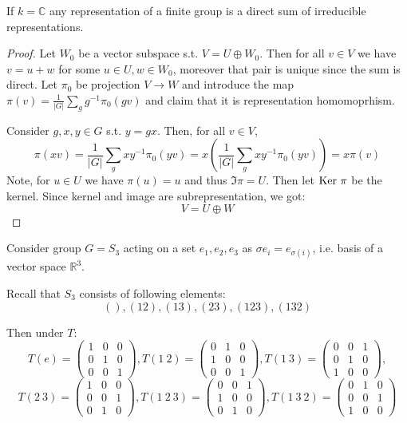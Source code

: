 \documentclass{amsart}
\def\ker{\rm Ker\ }
\begin{document}
\begin{lemma}
    If $k = \mathbb{C}$ any representation of a finite group is a direct sum of irreducible representations.
\end{lemma}
\begin{proof}
    Let $W_0$ be a vector subspace s.t. $V = U \oplus W_0$. Then for all $v \in V$ we have $v=u+w$ for some $u \in U, w \in W_0$, moreover that pair is unique since the sum is direct. Let $\pi_0$ be projection $V \to W$ and introduce the map
    $\pi(v) = \frac 1 {|G|} \sum_g g^{-1} \pi_0 (gv)$ and claim that it is representation homomoprhism.
    
    Consider $g,x,y \in G$ s.t. $y=gx$. Then, for all $v \in V$,
    $$\pi(xv) = \frac 1 {|G|} \sum_g x y^{-1} \pi_0 (yv) = x (\frac 1 {|G|} \sum_g x y^{-1} \pi_0 (yv)) = x \pi(v)$$
    Note, for $u \in U$ we have $\pi(u) = u$ and thus $\Im \pi = U$. Then let $\ker \pi$ be the kernel. Since kernel and image are subrepresentation, we got:
    $$ V = U \oplus W$$ 
\end{proof}

\begin{example}
    Consider group $G=S_3$ acting on a set $e_1, e_2, e_3$ as $\sigma e_i = e_{\sigma(i)}$, i.e. basis of a vector space $\mathbb{R}^3$. 
\end{example}

Recall that $S_3$ consists of following elements:
$$ (), (1 2), (1 3), (2 3), (1 2 3), (1 3 2) $$

Then under $T$: 
\begin{equation*}
T(e) = 
\begin{pmatrix}
    1 & 0 & 0 \\
    0 & 1 & 0 \\
    0 & 0 & 1
\end{pmatrix},
T (1\ 2) = 
\begin{pmatrix}
    0 & 1 & 0 \\
    1 & 0 & 0 \\
    0 & 0 & 1 
\end{pmatrix},
T (1\ 3) =
\begin{pmatrix}
    0 & 0 & 1 \\
    0 & 1 & 0 \\
    1 & 0 & 0 
\end{pmatrix},
\end{equation*}
\begin{equation*}
T (2\ 3) =
\begin{pmatrix}
    1 & 0 & 0 \\
    0 & 0 & 1 \\
    0 & 1 & 0 
\end{pmatrix},
T (1\ 2\ 3) =
\begin{pmatrix}
    0 & 0 & 1 \\
    1 & 0 & 0 \\
    0 & 1 & 0 
\end{pmatrix},
T (1\ 3\ 2) =
\begin{pmatrix}
    0 & 1 & 0 \\
    0 & 0 & 1 \\
    1 & 0 & 0 
\end{pmatrix}
\end{equation*}
\end{document}
